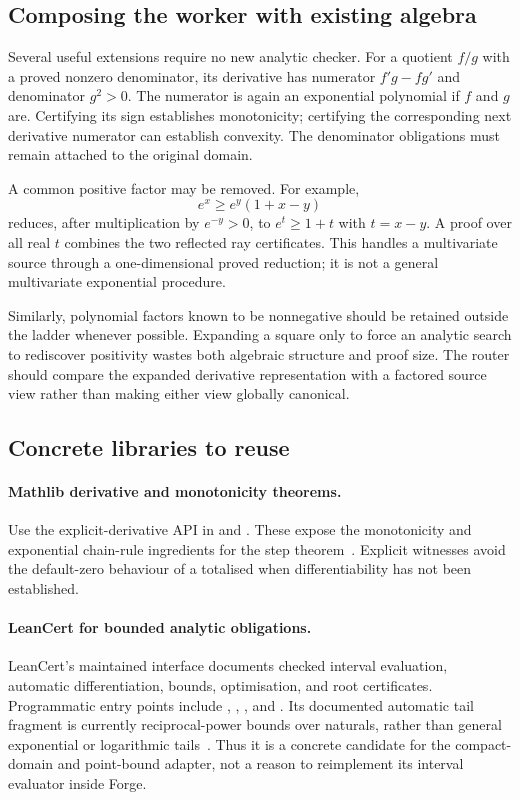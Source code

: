\subsection{Composing the worker with existing algebra}

Several useful extensions require no new analytic checker. For a quotient
$f/g$ with a proved nonzero denominator, its derivative has numerator
$f'g-fg'$ and denominator $g^2>0$. The numerator is again an exponential
polynomial if $f$ and $g$ are. Certifying its sign establishes monotonicity;
certifying the corresponding next derivative numerator can establish convexity.
The denominator obligations must remain attached to the original domain.

A common positive factor may be removed. For example,
\[
 e^x\ge e^y(1+x-y)
\]
reduces, after multiplication by $e^{-y}>0$, to
$e^t\ge1+t$ with $t=x-y$. A proof over all real $t$ combines the two reflected
ray certificates. This handles a multivariate source through a one-dimensional
proved reduction; it is not a general multivariate exponential procedure.

Similarly, polynomial factors known to be nonnegative should be retained
outside the ladder whenever possible. Expanding a square only to force an
analytic search to rediscover positivity wastes both algebraic structure and
proof size. The router should compare the expanded derivative representation
with a factored source view rather than making either view globally canonical.

\subsection{Concrete libraries to reuse}

\paragraph{Mathlib derivative and monotonicity theorems.}
Use the explicit-derivative API in
and
.
These expose the monotonicity and exponential chain-rule ingredients for the
step theorem~\cite{mathlib-meanvalue,mathlib-expderiv}. Explicit
 witnesses avoid the default-zero behaviour of a totalised
 when differentiability has not been established.

\paragraph{LeanCert for bounded analytic obligations.}
LeanCert's maintained interface documents checked interval evaluation,
automatic differentiation, bounds, optimisation, and root certificates.
Programmatic entry points include ,
, , and
. Its documented automatic tail fragment is
currently reciprocal-power bounds over naturals, rather than general
exponential or logarithmic tails~\cite{leancert}. Thus it is a concrete
candidate for the compact-domain and point-bound adapter, not a reason to
reimplement its interval evaluator inside Forge.

